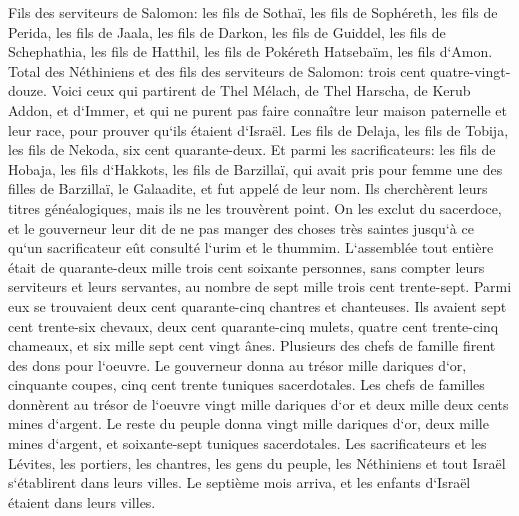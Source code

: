 \verse Fils des serviteurs de Salomon: les fils de Sothaï, les fils de Sophéreth, les fils de Perida, 
\verse les fils de Jaala, les fils de Darkon, les fils de Guiddel, 
\verse les fils de Schephathia, les fils de Hatthil, les fils de Pokéreth Hatsebaïm, les fils d`Amon. 
\verse Total des Néthiniens et des fils des serviteurs de Salomon: trois cent quatre-vingt-douze. 
\verse Voici ceux qui partirent de Thel Mélach, de Thel Harscha, de Kerub Addon, et d`Immer, et qui ne purent pas faire connaître leur maison paternelle et leur race, pour prouver qu`ils étaient d`Israël. 
\verse Les fils de Delaja, les fils de Tobija, les fils de Nekoda, six cent quarante-deux. 
\verse Et parmi les sacrificateurs: les fils de Hobaja, les fils d`Hakkots, les fils de Barzillaï, qui avait pris pour femme une des filles de Barzillaï, le Galaadite, et fut appelé de leur nom. 
\verse Ils cherchèrent leurs titres généalogiques, mais ils ne les trouvèrent point. On les exclut du sacerdoce, 
\verse et le gouverneur leur dit de ne pas manger des choses très saintes jusqu`à ce qu`un sacrificateur eût consulté l`urim et le thummim. 
\verse L`assemblée tout entière était de quarante-deux mille trois cent soixante personnes, 
\verse sans compter leurs serviteurs et leurs servantes, au nombre de sept mille trois cent trente-sept. Parmi eux se trouvaient deux cent quarante-cinq chantres et chanteuses. 
\verse Ils avaient sept cent trente-six chevaux, deux cent quarante-cinq mulets, 
\verse quatre cent trente-cinq chameaux, et six mille sept cent vingt ânes. 
\verse Plusieurs des chefs de famille firent des dons pour l`oeuvre. Le gouverneur donna au trésor mille dariques d`or, cinquante coupes, cinq cent trente tuniques sacerdotales. 
\verse Les chefs de familles donnèrent au trésor de l`oeuvre vingt mille dariques d`or et deux mille deux cents mines d`argent. 
\verse Le reste du peuple donna vingt mille dariques d`or, deux mille mines d`argent, et soixante-sept tuniques sacerdotales. 
\verse Les sacrificateurs et les Lévites, les portiers, les chantres, les gens du peuple, les Néthiniens et tout Israël s`établirent dans leurs villes. Le septième mois arriva, et les enfants d`Israël étaient dans leurs villes. 

